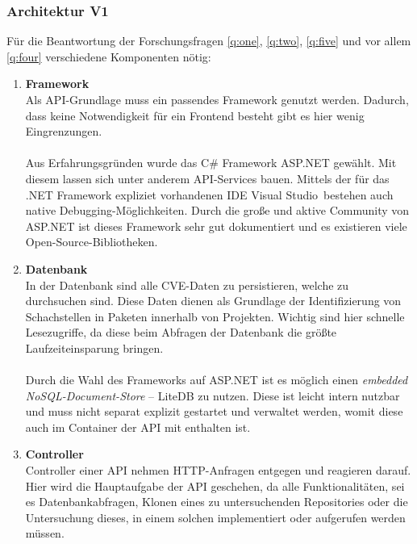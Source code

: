 \subsubsection{Architektur V1} \label{sec:Architektur}
    Für die Beantwortung der Forschungsfragen \ref{q:one}, \ref{q:two}, \ref{q:five} und vor allem \ref{q:four} verschiedene Komponenten nötig:
    \begin{enumerate}
        \item \textbf{Framework} \label{arch_1}\\
            Als API-Grundlage muss ein passendes Framework genutzt werden.
            Dadurch, dass keine Notwendigkeit für ein Frontend besteht gibt es hier wenig Eingrenzungen.
            \\ \\
            Aus Erfahrungsgründen wurde das C\# Framework ASP.NET gewählt.
            Mit diesem lassen sich unter anderem API-Services bauen.
            Mittels der für das .NET Framework expliziet vorhandenen IDE \glqq Visual Studio\grqq~bestehen auch native Debugging-Möglichkeiten.
            Durch die große und aktive Community von ASP.NET ist dieses Framework sehr gut dokumentiert und es existieren viele Open-Source-Bibliotheken.
        \item \textbf{Datenbank} \label{arch_2}\\
            In der Datenbank sind alle CVE-Daten zu persistieren, welche zu durchsuchen sind.
            Diese Daten dienen als Grundlage der Identifizierung von Schachstellen in Paketen innerhalb von Projekten.
            Wichtig sind hier schnelle Lesezugriffe, da diese beim Abfragen der Datenbank die größte Laufzeiteinsparung bringen.
            \\ \\
            Durch die Wahl des Frameworks auf ASP.NET ist es möglich einen \textit{embedded NoSQL-Document-Store} -- LiteDB zu nutzen. %
            Diese ist leicht intern nutzbar und muss nicht separat explizit gestartet und verwaltet werden, womit diese auch im Container der API mit enthalten ist.
        \item \textbf{Controller} \label{arch_3}\\
            Controller einer API nehmen HTTP-Anfragen entgegen und reagieren darauf.
            Hier wird die Hauptaufgabe der API geschehen, da alle Funktionalitäten, sei es Datenbankabfragen, Klonen eines zu untersuchenden Repositories oder die Untersuchung dieses, in einem solchen implementiert oder aufgerufen werden müssen.

\end{enumerate}
